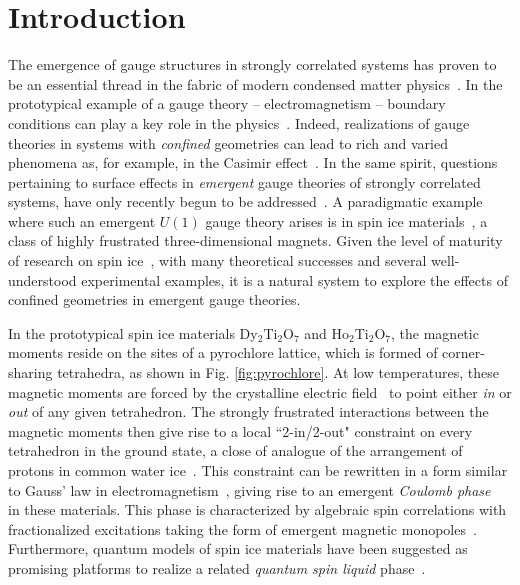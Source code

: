 \documentclass[aps,prx,reprint,runinaddress,superscriptaddress,amsmath,amssymb,floatfix,longbibliography]{revtex4-1}
\begin{document}
\section{Introduction}

The emergence of gauge structures in strongly correlated systems has proven to be an essential thread in the fabric of modern condensed matter physics~\cite{Kogut,Nagaosa_book,Wen_book,Lee_RMP}. In the prototypical example of a gauge theory -- electromagnetism -- boundary conditions can play a key role in the physics~\cite{jackson2007classical}. Indeed, realizations of gauge theories in systems with \emph{confined} geometries can lead to rich and varied phenomena as, for example, in the Casimir effect~\cite{milton2001casimir,bordag2001new}. In the same spirit, questions pertaining to surface effects in \emph{emergent} gauge theories of
strongly correlated systems, have only recently begun to be addressed~\cite{senthil2016}. A paradigmatic example where such an emergent $U(1)$ gauge theory arises is in spin ice materials~\cite{Harris1997,Ramirez1999}, a class of highly frustrated three-dimensional magnets. Given the level of maturity of research on spin ice~\cite{Bramwell_book2004,Gingras2011}, with many theoretical successes and several well-understood experimental examples, it is a natural system to explore the effects of confined geometries in emergent gauge theories.

In the prototypical spin ice materials Dy$_2$Ti$_2$O$_7$ and Ho$_2$Ti$_2$O$_7$, the magnetic moments reside on the sites of a pyrochlore lattice, which is formed of corner-sharing tetrahedra, as shown in Fig. \ref{fig:pyrochlore}. At low temperatures, these magnetic moments are forced by the crystalline electric field~\cite{RauPRB2015} to point either \emph{in} or \emph{out} of any given tetrahedron. The strongly frustrated interactions between the magnetic moments then give rise to a local ``2-in/2-out" constraint on every tetrahedron in the ground state, a close of analogue of the arrangement of protons in common water ice~\cite{Bramwell_book2004,Gingras2011}. This constraint can be rewritten in a form similar to Gauss' law in electromagnetism~\cite{Henley2005}, giving rise to an emergent \emph{Coulomb phase}~\cite{Henley2010,Castelnovo_AnnRevCMP} in these materials. This phase is characterized by algebraic spin correlations with fractionalized excitations taking the form of emergent magnetic monopoles~\cite{Castelnovo2008a,Castelnovo_AnnRevCMP}. Furthermore, quantum models of spin ice materials have been suggested as promising platforms to realize a related \emph{quantum spin liquid} phase~\cite{Gingras2014}.
\end{document}
